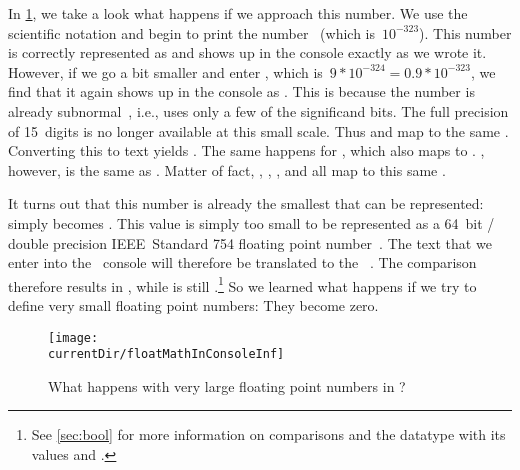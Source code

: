 In \cref{fig:floatMathInConsoleInf}, we take a look what happens if we approach this number.
We use the scientific notation and begin to print the number~ (which is~$10^{-323}$).
This number is correctly represented as  and shows up in the console exactly as we wrote it.
However, if we go a bit smaller and enter , which is~$9*10^{-324}=0.9*10^{-323}$, we find that it again shows up in the console as .
This is because the number is already subnormal~\cite{IEEE2019ISFFPA,H1997IS7FPN}, i.e., uses only a few of the significand bits.
The full precision of 15~digits is no longer available at this small scale.
Thus  and  map to the same .
Converting this  to text yields .
The same happens for , which also maps to .
, however, is the same as .
Matter of fact, , , , and  all map to this same .

It turns out that this number is already the smallest  that can be represented:
 simply becomes .
This value is simply too small to be represented as a 64~bit / double precision IEEE~Standard 754 floating point number~\cite{IEEE2019ISFFPA,H1997IS7FPN}.
The text  that we enter into the \python\ console will therefore be translated to the ~.
The comparison \pythonIdx{==} therefore results in , while  is still .\footnote{%
See \cref{sec:bool} for more information on comparisons and the  datatype with its values  and .%
}
So we learned what happens if we try to define very small floating point numbers:
They become zero.

\begin{figure}%
\centering%
\texttt{[image: \\currentDir/floatMathInConsoleInf]}%
\caption{What happens with very large floating point numbers in \python?}%
\label{fig:floatMathInConsoleInf}%
\end{figure}%

